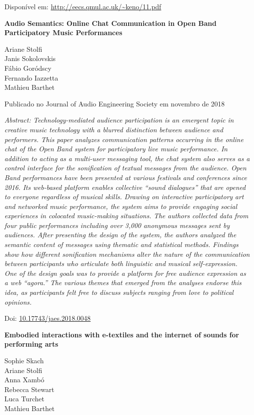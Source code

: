 Disponível em: \url{http://eecs.qmul.ac.uk/~keno/11.pdf}


\textbf{Audio Semantics: Online Chat Communication in Open Band Participatory Music Performances}

Ariane Stolfi \\
Janis Sokolovskis \\
Fábio Goródscy \\
Fernando Iazzetta \\
Mathieu Barthet

Publicado no Journal of Audio Engineering Society em novembro de 2018

\textit{Abstract: Technology-mediated audience participation is an emergent topic in creative music technology with a blurred distinction between audience and performers. This paper analyzes communication patterns occurring in the online chat of the Open Band system for participatory live music performance. In addition to acting as a multi-user messaging tool, the chat system also serves as a control interface for the sonification of textual messages from the audience. Open Band performances have been presented at various festivals and conferences since 2016. Its web-based platform enables collective “sound dialogues” that are opened to everyone regardless of musical skills. Drawing on interactive participatory art and networked music performance, the system aims to provide engaging social experiences in colocated music-making situations. The authors collected data from four public performances including over 3,000 anonymous messages sent by audiences. After presenting the design of the system, the authors analyzed the semantic content of messages using thematic and statistical methods. Findings show how different sonification mechanisms alter the nature of the communication between participants who articulate both linguistic and musical self-expression. One of the design goals was to provide a platform for free audience expression as a web “agora.” The various themes that emerged from the analyses endorse this idea, as participants felt free to discuss subjects ranging from love to political opinions.}

Doi: \url{10.17743/jaes.2018.0048}

\textbf{Embodied interactions with e-textiles and the internet of sounds for performing arts}

Sophie Skach\\
Ariane Stolfi\\
Anna Xambó\\
Rebecca Stewart\\
Luca Turchet\\
Mathieu Barthet\\

